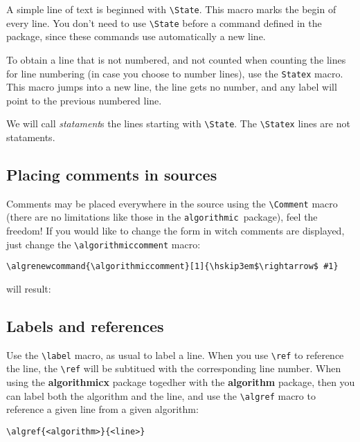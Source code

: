 \documentclass{article}
\newcommand{\old}{\texttt{algorithmic}}
\begin{document}
A simple line of text is beginned with \verb:\State:. This macro marks the begin of every 
line. You don't need to use \verb:\State: before a command defined in the package, since 
these commands use automatically a new line.

To obtain a line that is not numbered, and not counted when counting the lines for line numbering
(in case you choose to number lines), use the \verb:Statex: macro. This macro jumps into a new line, 
the line gets no number, and any label will point to the previous numbered line.

We will call \textit{statament\/}s the lines starting with \verb:\State:. The \verb:\Statex: 
lines are not stataments.



\subsection{Placing comments in sources}\label{Putting comments in sources}

Comments may be placed everywhere in the source using the \verb:\Comment: macro 
(there are no limitations like those in the \old\ package), feel the freedom!
If you would like to change the form in witch comments are displayed, just 
change the \verb:\algorithmiccomment: macro:

\begin{verbatim}
\algrenewcommand{\algorithmiccomment}[1]{\hskip3em$\rightarrow$ #1}
\end{verbatim}

will result:
\medskip
{}



\subsection{Labels and references}
Use the \verb:\label: macro, as usual to label a line. When you use \verb:\ref: to reference 
the line, the \verb:\ref: will be subtitued with the corresponding line number. When using the 
\textbf{algorithmicx} package togedher with the \textbf{algorithm} package, then you can label 
both the algorithm and the line, and use the \verb:\algref: macro to reference a given line 
from a given algorithm:

\begin{verbatim}
\algref{<algorithm>}{<line>}
\end{verbatim}
\end{document}
